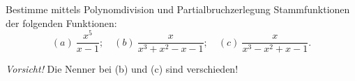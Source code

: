 \begin{prob}
Bestimme mittels Polynomdivision und Partialbruchzerlegung Stammfunktionen der folgenden Funktionen:
$$
(a)\ \frac{x^5}{x-1};\quad
(b)\ \frac{x}{x^3+x^2-x-1};\quad
(c)\ \frac{x}{x^3-x^2+x-1}.
$$

\textit{Vorsicht!} Die Nenner bei (b) und (c) sind verschieden!
\end{prob}
